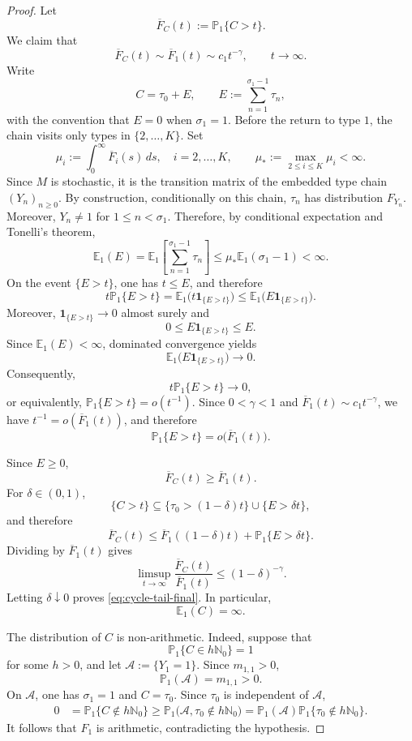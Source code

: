 \documentclass[reqno,final,11pt]{amsart}
\newcommand{\N}{\mathbb N}
\newcommand{\E}{\mathbb E}
\newcommand{\Pbb}{\mathbb P}
\newcommand{\ind}[1]{\mathbf 1_{\{#1\}}}
\theoremstyle{plain}
\theoremstyle{definition}
\theoremstyle{remark}
\numberwithin{equation}{section}
\begin{document}
\begin{proof}
Let
\[
  \overline F_C(t):=\Pbb_1\{C>t\}.
\]
We claim that
\begin{equation}\label{eq:cycle-tail-final}
  \overline F_C(t)
  \sim\overline F_1(t)
  \sim c_1t^{-\gamma},
  \qquad t\to\infty.
\end{equation}
Write
\[
  C=\tau_0+E,
  \qquad
  E:=\sum_{n=1}^{\sigma_1-1}\tau_n,
\]
with the convention that \(E=0\) when \(\sigma_1=1\). Before the return to type \(1\), the chain visits only types in \(\{2,\dots,K\}\). Set
\[
  \mu_i:=\int_0^\infty\overline F_i(s)\,ds,\quad i=2,\dots,K,
  \qquad
  \mu_*:=\max_{2\le i\le K}\mu_i<\infty.
\]
Since \(M\) is stochastic, it is the transition matrix of the embedded type chain \((Y_n)_{n\ge0}\). By construction, conditionally on this chain, \(\tau_n\) has distribution \(F_{Y_n}\). Moreover, \(Y_n\ne1\) for \(1\le n<\sigma_1\). Therefore, by conditional expectation and Tonelli's theorem,
\[
  \E_1(E)
  =
  \E_1\left[\sum_{n=1}^{\sigma_1-1}\tau_{n}\right]
  \le
  \mu_*\E_1(\sigma_1-1)
  <\infty.
\]
On the event \(\{E>t\}\), one has \(t\le E\), and therefore
\[
  t\Pbb_1\{E>t\}
  =
  \E_1\bigl(t\ind{E>t}\bigr)
  \le
  \E_1\bigl(E\ind{E>t}\bigr).
\]
Moreover, \(\ind{E>t}\to0\) almost surely and
\[
  0\le E\ind{E>t}\le E.
\]
Since \(\E_1(E)<\infty\), dominated convergence yields
\[
  \E_1\bigl(E\ind{E>t}\bigr)\longrightarrow0.
\]
Consequently,
\[
  t\Pbb_1\{E>t\}\longrightarrow0,
\]
or equivalently, \(\Pbb_1\{E>t\}=o(t^{-1})\). Since \(0<\gamma<1\) and \(\overline F_1(t)\sim c_1t^{-\gamma}\), we have \(t^{-1}=o(\overline F_1(t))\), and therefore
\[
  \Pbb_1\{E>t\}
  =
  o\bigl(\overline F_1(t)\bigr).
\]


Since \(E\ge0\),
\[
  \overline F_C(t)\ge\overline F_1(t).
\]
For \(\delta\in(0,1)\),
\[
  \{C>t\}
  \subseteq
  \{\tau_0>(1-\delta)t\}\cup\{E>\delta t\},
\]
and therefore
\[
  \overline F_C(t)
  \le
  \overline F_1((1-\delta)t)+\Pbb_1\{E>\delta t\}.
\]
Dividing by \(\overline F_1(t)\) gives
\[
  \limsup_{t\to\infty}
  \frac{\overline F_C(t)}{\overline F_1(t)}
  \le(1-\delta)^{-\gamma}.
\]
Letting \(\delta\downarrow0\) proves \eqref{eq:cycle-tail-final}. In particular,
\[
  \E_1(C)=\infty.
\]

The distribution of \(C\) is non-arithmetic. Indeed, suppose that
\[
  \Pbb_1\{C\in h\N_0\}=1
\]
for some \(h>0\), and let \(\mathcal A:=\{Y_1=1\}\). Since \(m_{1,1}>0\),
\[
  \Pbb_1(\mathcal A)=m_{1,1}>0.
\]
On \(\mathcal A\), one has \(\sigma_1=1\) and \(C=\tau_0\). Since \(\tau_0\) is independent of \(\mathcal A\),
\[
\begin{split}
  0
  &=
  \Pbb_1\{C\notin h\N_0\}\ge
  \Pbb_1\bigl(\mathcal A,\tau_0\notin h\N_0\bigr)=
  \Pbb_1(\mathcal A)\Pbb_1\{\tau_0\notin h\N_0\}.
\end{split}
\]
It follows that \(F_1\) is arithmetic, contradicting the hypothesis.


\end{proof}
\end{document}

